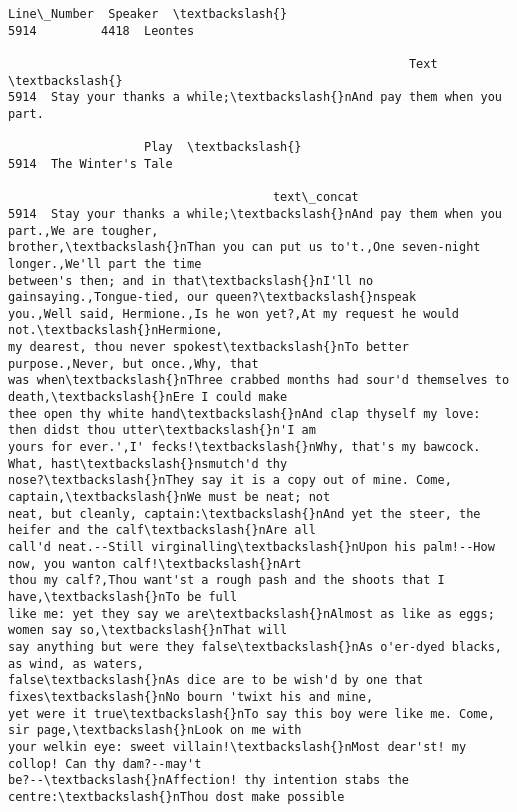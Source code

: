 \documentclass[11pt]{article}
\makeatletter
\newcommand{\boxspacing}{\kern\kvtcb@left@rule\kern\kvtcb@boxsep}
\newcommand{\prompt}[4]{
        \ttfamily\llap{{\color{#2}[#3]:\hspace{3pt}#4}}\vspace{-\baselineskip}
    }
\makeatother
\begin{document}
            \begin{tcolorbox}[breakable, size=fbox, boxrule=.5pt, pad at break*=1mm, opacityfill=0]
\prompt{Out}{outcolor}{182}{\boxspacing}
\begin{Verbatim}[commandchars=\\\{\}]
      Line\_Number  Speaker  \textbackslash{}
5914         4418  Leontes

                                                        Text  \textbackslash{}
5914  Stay your thanks a while;\textbackslash{}nAnd pay them when you part.

                   Play  \textbackslash{}
5914  The Winter's Tale

                                     text\_concat
5914  Stay your thanks a while;\textbackslash{}nAnd pay them when you part.,We are tougher,
brother,\textbackslash{}nThan you can put us to't.,One seven-night longer.,We'll part the time
between's then; and in that\textbackslash{}nI'll no gainsaying.,Tongue-tied, our queen?\textbackslash{}nspeak
you.,Well said, Hermione.,Is he won yet?,At my request he would not.\textbackslash{}nHermione,
my dearest, thou never spokest\textbackslash{}nTo better purpose.,Never, but once.,Why, that
was when\textbackslash{}nThree crabbed months had sour'd themselves to death,\textbackslash{}nEre I could make
thee open thy white hand\textbackslash{}nAnd clap thyself my love: then didst thou utter\textbackslash{}n'I am
yours for ever.',I' fecks!\textbackslash{}nWhy, that's my bawcock. What, hast\textbackslash{}nsmutch'd thy
nose?\textbackslash{}nThey say it is a copy out of mine. Come, captain,\textbackslash{}nWe must be neat; not
neat, but cleanly, captain:\textbackslash{}nAnd yet the steer, the heifer and the calf\textbackslash{}nAre all
call'd neat.--Still virginalling\textbackslash{}nUpon his palm!--How now, you wanton calf!\textbackslash{}nArt
thou my calf?,Thou want'st a rough pash and the shoots that I have,\textbackslash{}nTo be full
like me: yet they say we are\textbackslash{}nAlmost as like as eggs; women say so,\textbackslash{}nThat will
say anything but were they false\textbackslash{}nAs o'er-dyed blacks, as wind, as waters,
false\textbackslash{}nAs dice are to be wish'd by one that fixes\textbackslash{}nNo bourn 'twixt his and mine,
yet were it true\textbackslash{}nTo say this boy were like me. Come, sir page,\textbackslash{}nLook on me with
your welkin eye: sweet villain!\textbackslash{}nMost dear'st! my collop! Can thy dam?--may't
be?--\textbackslash{}nAffection! thy intention stabs the centre:\textbackslash{}nThou dost make possible

\end{Verbatim}
\end{tcolorbox}
\end{document}
